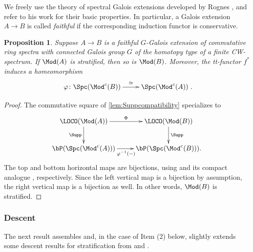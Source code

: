 \documentclass{amsart}%
\numberwithin{equation}{section}%
\newtheorem{Prop}[subsection]{Proposition}
\theoremstyle{remark}
\begin{document}
We freely use the theory of spectral Galois extensions developed by Rognes \cite{Rognes08}, and refer to his work for their basic properties. In particular, a Galois extension $A \to B$ is called \emph{faithful} if the corresponding induction functor is conservative. 

\begin{Prop}\label{prop:galoisascent}
Suppose $A \to B$ is a faithful $G$-Galois extension of commutative ring spectra with connected Galois group $G$ of the homotopy type of a finite CW-spectrum. If $\Mod(A)$ is stratified, then so is $\Mod(B)$. Moreover, the tt-functor $f^*$ induces a homeomorphism
\[
\xymatrix{\varphi\colon\Spc(\Mod^c(B)) \ar[r]^-{\cong} & \Spc(\Mod^c(A))}.
\]
\end{Prop}
\begin{proof}
The commutative square of \cref{lem:Suppcompatibility} specializes to 
\[
\xymatrix{\LOCO(\Mod(A)) \ar[r]^-{\Phi} \ar[d]_-{\Supp} & \LOCO(\Mod(B)) \ar[d]^-{\Supp} \\
    \bP(\Spc(\Mod^c(A))) \ar[r]_{\varphi^{-1}(-)} & \bP(\Spc(\Mod^c(B))).}
\]
The top and bottom horizontal maps are bijections, using \cite[Thm.~6.5]{mathew_torus} and its compact analogue \cite{bchnp1}, respectively. Since the left vertical map is a bijection by assumption, the right vertical map is a bijection as well. In other words, $\Mod(B)$ is stratified. 
\end{proof}

\subsubsection*{Descent}

The next result assembles and, in the case of Item (2) below, slightly extends some descent results for stratification from \cite{bhs1} and \cite{barthel_integral1}.
\end{document}
